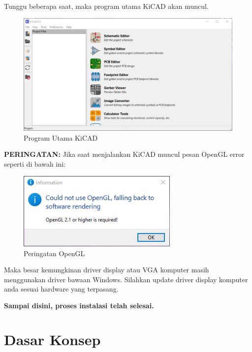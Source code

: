 \documentclass[12pt]{book}
\begin{document}
	\newpage
	Tunggu beberapa saat, maka program utama KiCAD akan muncul.

	\begin{figure}[!ht]
		\centering
		\includegraphics[width=\textwidth]{images/installations/kicad_first}
		\caption{Program Utama KiCAD}
	\end{figure}

	\textbf{PERINGATAN:} Jika saat menjalankan KiCAD muncul pesan OpenGL error seperti di bawah ini:

	\begin{figure}[!ht]
		\centering
		\includegraphics[width=0.7\textwidth]{images/installations/kicad_warn_noopengl}
		\caption{Peringatan OpenGL}
	\end{figure}

	Maka besar kemungkinan driver display atau VGA komputer masih menggunakan driver bawaan Windows.
	Silahkan update driver display komputer anda sesuai hardware yang terpasang.\\

	\begin{center}
		\textbf{Sampai disini, proses instalasi telah selesai.}
	\end{center}


	\newpage
	\chapter{Dasar Konsep}
\end{document}
